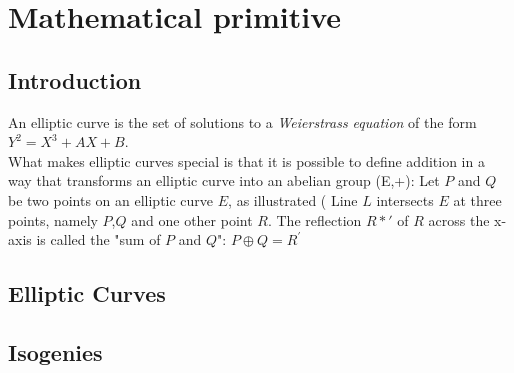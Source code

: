 \section{Mathematical primitive}
\subsection{Introduction}
An elliptic curve is the set of solutions to a \textit{Weierstrass equation} of the form $Y^2=X^3+AX+B$.\\ 


What makes elliptic curves special is that it is possible to define addition in a way that transforms an elliptic curve into an abelian group (E,+):
Let $P$ and $Q$ be two points on an elliptic curve $E$, as illustrated (%
Line $L$ intersects $E$ at three points, namely $P$,$Q$ and one other point $R$. The reflection $R*{\prime}$ of $R$ across the x-axis is called the "sum of $P$ and $Q$": $P \oplus Q = R^{\prime}$


\subsection{Elliptic Curves}



\subsection{Isogenies}
